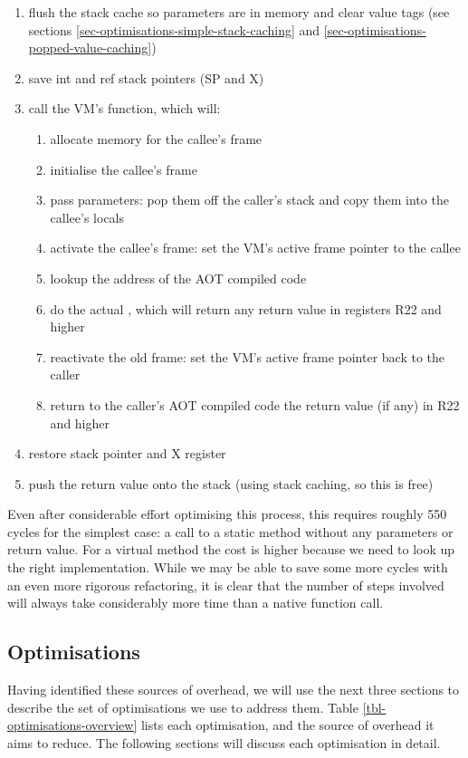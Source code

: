 \begin{enumerate}
  \small
  \item flush the stack cache so parameters are in memory and clear value tags (see sections \ref{sec-optimisations-simple-stack-caching} and \ref{sec-optimisations-popped-value-caching})
  \item save int and ref stack pointers (SP and X)
  \item call the VM's  function, which will:
  \begin{enumerate}
    \item allocate memory for the callee's frame
    \item initialise the callee's frame
    \item pass parameters: pop them off the caller's stack and copy them into the callee's locals
    \item activate the callee's frame: set the VM's active frame pointer to the callee
    \item lookup the address of the AOT compiled code
    \item do the actual , which will return any return value in registers R22 and higher
    \item reactivate the old frame: set the VM's active frame pointer back to the caller
    \item return to the caller's AOT compiled code the return value (if any) in R22 and higher
  \end{enumerate}
  \item restore stack pointer and X register
  \item push the return value onto the stack (using stack caching, so this is free)
\end{enumerate}

Even after considerable effort optimising this process, this requires roughly 550 cycles for the simplest case: a call to a static method without any parameters or return value. For a virtual method the cost is higher because we need to look up the right implementation. While we may be able to save some more cycles with an even more rigorous refactoring, it is clear that the number of steps involved will always take considerably more time than a native function call.

\subsection{Optimisations}
\label{sec-optimisations-java-source}
Having identified these sources of overhead, we will use the next three sections to describe the set of optimisations we use to address them. Table \ref{tbl-optimisations-overview} lists each optimisation, and the source of overhead it aims to reduce. The following sections will discuss each optimisation in detail.

